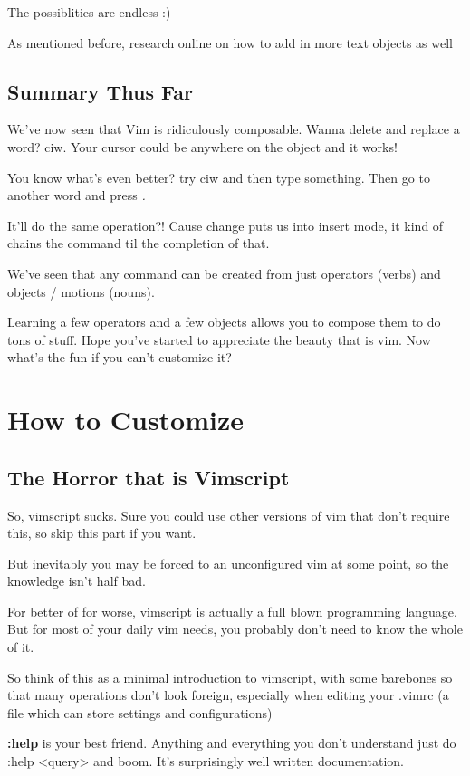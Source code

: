 \documentclass[12pt, letterpaper]{article}
\begin{document}
The possiblities are endless :)

As mentioned before, research online on how to add in more text objects as well

\subsection{Summary Thus Far}

We've now seen that Vim is ridiculously composable. Wanna delete and replace a
word? ciw. Your cursor could be anywhere on the object and it works!

You know what's even better? try ciw and then type something. Then go to
another word and press \textit{.}

It'll do the same operation?! Cause change puts us into insert mode, it kind of
chains the command til the completion of that. 

We've seen that any command can be created from just operators (verbs) and
objects / motions (nouns). 

Learning a few operators and a few objects allows you to compose them to do
tons of stuff. Hope you've started to appreciate the beauty that is vim. Now
what's the fun if you can't customize it?

\section{How to Customize}
\subsection{The Horror that is Vimscript}
So, vimscript sucks. Sure you could use other versions of vim that don't
require this, so skip this part if you want.

But inevitably you may be forced to an unconfigured vim at some point, so the
knowledge isn't half bad.

For better of for worse, vimscript is actually a full blown programming
language. But for most of your daily vim needs, you probably don't need to know
the whole of it. 

So think of this as a minimal introduction to vimscript, with some barebones so
that many operations don't look foreign, especially when editing your .vimrc (a
file which can store settings and configurations)

\textbf{:help} is your best friend. Anything and everything you don't
understand just do :help <query> and boom. It's surprisingly well written
documentation.
\end{document}
